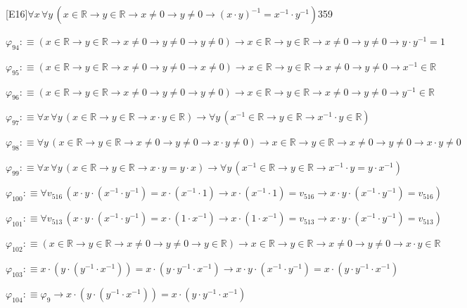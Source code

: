 \begin{fullproof}{[E16]}{$\forall x\,\forall y\,(x \in \mathbb{R} \to y \in \mathbb{R} \to x \neq 0 \to y \neq 0 \to (x \cdot y)^{-1} = x^{-1} \cdot y^{-1})$}{359}
\begin{abbrevlist}
\item $\varphi_{94} :\equiv (x \in \mathbb{R} \to y \in \mathbb{R} \to x \neq 0 \to y \neq 0 \to y \neq 0) \to x \in \mathbb{R} \to y \in \mathbb{R} \to x \neq 0 \to y \neq 0 \to y \cdot y^{-1} = 1$
\item $\varphi_{95} :\equiv (x \in \mathbb{R} \to y \in \mathbb{R} \to x \neq 0 \to y \neq 0 \to x \neq 0) \to x \in \mathbb{R} \to y \in \mathbb{R} \to x \neq 0 \to y \neq 0 \to x^{-1} \in \mathbb{R}$
\item $\varphi_{96} :\equiv (x \in \mathbb{R} \to y \in \mathbb{R} \to x \neq 0 \to y \neq 0 \to y \neq 0) \to x \in \mathbb{R} \to y \in \mathbb{R} \to x \neq 0 \to y \neq 0 \to y^{-1} \in \mathbb{R}$
\item $\varphi_{97} :\equiv \forall x\,\forall y\,(x \in \mathbb{R} \to y \in \mathbb{R} \to x \cdot y \in \mathbb{R}) \to \forall y\,(x^{-1} \in \mathbb{R} \to y \in \mathbb{R} \to x^{-1} \cdot y \in \mathbb{R})$
\item $\varphi_{98} :\equiv \forall y\,(x \in \mathbb{R} \to y \in \mathbb{R} \to x \neq 0 \to y \neq 0 \to x \cdot y \neq 0) \to x \in \mathbb{R} \to y \in \mathbb{R} \to x \neq 0 \to y \neq 0 \to x \cdot y \neq 0$
\item $\varphi_{99} :\equiv \forall x\,\forall y\,(x \in \mathbb{R} \to y \in \mathbb{R} \to x \cdot y = y \cdot x) \to \forall y\,(x^{-1} \in \mathbb{R} \to y \in \mathbb{R} \to x^{-1} \cdot y = y \cdot x^{-1})$
\item $\varphi_{100} :\equiv \forall v_{516}\,(x \cdot y \cdot (x^{-1} \cdot y^{-1}) = x \cdot (x^{-1} \cdot 1) \to x \cdot (x^{-1} \cdot 1) = v_{516} \to x \cdot y \cdot (x^{-1} \cdot y^{-1}) = v_{516})$
\item $\varphi_{101} :\equiv \forall v_{513}\,(x \cdot y \cdot (x^{-1} \cdot y^{-1}) = x \cdot (1 \cdot x^{-1}) \to x \cdot (1 \cdot x^{-1}) = v_{513} \to x \cdot y \cdot (x^{-1} \cdot y^{-1}) = v_{513})$
\item $\varphi_{102} :\equiv (x \in \mathbb{R} \to y \in \mathbb{R} \to x \neq 0 \to y \neq 0 \to y \in \mathbb{R}) \to x \in \mathbb{R} \to y \in \mathbb{R} \to x \neq 0 \to y \neq 0 \to x \cdot y \in \mathbb{R}$
\item $\varphi_{103} :\equiv x \cdot (y \cdot (y^{-1} \cdot x^{-1})) = x \cdot (y \cdot y^{-1} \cdot x^{-1}) \to x \cdot y \cdot (x^{-1} \cdot y^{-1}) = x \cdot (y \cdot y^{-1} \cdot x^{-1})$
\item $\varphi_{104} :\equiv \varphi_{9} \to x \cdot (y \cdot (y^{-1} \cdot x^{-1})) = x \cdot (y \cdot y^{-1} \cdot x^{-1})$

\end{abbrevlist}
\end{fullproof}
